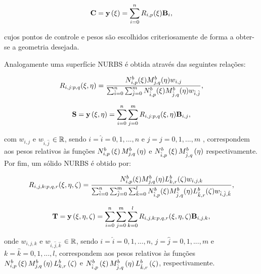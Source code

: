 \documentclass[tese_patricia]{subfiles}
\begin{document}
\begin{align}
\mathbf{C} = \mathbf{y}\left(\xi\right) = \sum_{i=0}^{n}R_{i,p}(\xi)\mathbf{B}_i, \label{eq:curveNURBS}
\end{align}

\noindent cujos pontos de controle e pesos são escolhidos criteriosamente de forma a obter-se a geometria desejada.

Analogamente uma superfície NURBS é obtida através das seguintes relações:

\begin{align}
R_{i,j:p,q}(\xi,\eta) = \frac{N^b_{i,p}(\xi)M^b_{j,q}(\eta)w_{i,j}}{\sum_{\hat{i}=0}^{n}\sum_{\hat{j}=0}^{m}N^b_{\hat{i},p}(\xi)M^b_{\hat{j},q}(\eta)w_{\hat{i},\hat{j}}},
\end{align}

\begin{align}
\mathbf{S} = \mathbf{y}\left(\xi,\eta\right) = \sum_{i=0}^{n}\sum_{j=0}^{m}R_{i,j:p,q}(\xi,\eta)\mathbf{B}_{i,j}, \label{eq:surfaceNURBS}
\end{align}

\noindent com $w_{i,j}$ e $w_{\hat{i},\hat{j}}$ $\in \mathbb{R}$, sendo $i = \hat{i} =  0, 1, ... , n$ e  $j = \hat{j} =  0, 1, ... , m$ , correspondem aos pesos relativos às funções $N^b_{i,p}\left(\xi\right)M^b_{j,q}\left(\eta\right)$ e $N^b_{\hat{i},p}\left(\xi\right)M^b_{\hat{j},q}\left(\eta\right)$ respectivamente. Por fim, um sólido NURBS é obtido por:

\begin{align}
R_{i,j,k:p,q,r}(\xi,\eta,\zeta) = \frac{N^b_{i,p}(\xi)M^b_{j,q}(\eta)L^b_{k,r}(\zeta)w_{i,j,k}}
{\sum_{\hat{i}=0}^{n}\sum_{\hat{j}=0}^{m}\sum_{\hat{k}=0}^{l}N^b_{\hat{i},p}(\xi)M^b_{\hat{j},q}(\eta)L^b_{\hat{k},r}(\zeta)w_{\hat{i},\hat{j},\hat{k}}},
\end{align}

\begin{align}
\mathbf{T} = \mathbf{y}\left(\xi,\eta,\zeta\right) = \sum_{i=0}^{n}\sum_{j=0}^{m}\sum_{k=0}^{l}R_{i,j,k:p,q,r}(\xi,\eta,\zeta)\mathbf{B}_{i,j,k}, \label{eq:solidNURBS}
\end{align}

\noindent onde $w_{i,j,k}$ e $w_{\hat{i},\hat{j},\hat{k}}$ $\in \mathbb{R}$, sendo $i = \hat{i} =  0, 1, ... , n$, $j = \hat{j} =  0, 1, ... , m$ e $k = \hat{k} =  0, 1, ... , l$, correspondem aos pesos relativos às funções $N^b_{i,p}\left(\xi\right)M^b_{j,q}\left(\eta\right)L^b_{k,r}\left(\zeta\right)$ e $N^b_{\hat{i},p}\left(\xi\right)M^b_{\hat{j},q}\left(\eta\right)L^b_{\hat{k},r}\left(\zeta\right)$, respectivamente.
\end{document}

